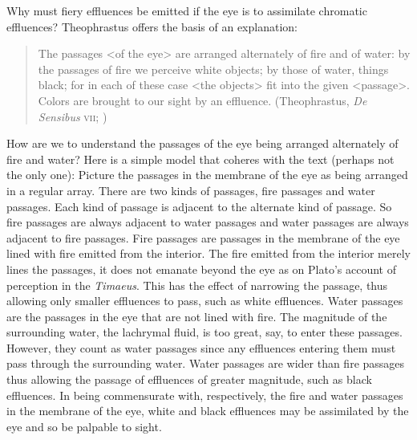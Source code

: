 Why must fiery effluences be emitted if the eye is to assimilate chromatic effluences? Theophrastus offers the basis of an explanation:
\begin{quote}
	The passages <of the eye> are arranged alternately of fire and of water: by the passages of fire we perceive white objects; by those of water, things black; for in each of these case <the objects> fit into the given <passage>. Colors are brought to our sight by an effluence. (Theophrastus, \emph{De Sensibus} \textsc{vii}; \citealt[71--73]{Stratton:1917vn})
\end{quote}
How are we to understand the passages of the eye being arranged alternately of fire and water? Here is a simple model that coheres with the text (perhaps not the only one): Picture the passages in the membrane of the eye as being arranged in a regular array. There are two kinds of passages, fire passages and water passages. Each kind of passage is adjacent to the alternate kind of passage. So fire passages are always adjacent to water passages and water passages are always adjacent to fire passages. Fire passages are passages in the membrane of the eye lined with fire emitted from the interior. The fire emitted from the interior merely lines the passages, it does not emanate beyond the eye as on Plato's account of perception in the \emph{Timaeus}. This has the effect of narrowing the passage, thus allowing only smaller effluences to pass, such as white effluences. Water passages are the passages in the eye that are not lined with fire. The magnitude of the surrounding water, the lachrymal fluid, is too great, say, to enter these passages. However, they count as water passages since any effluences entering them must pass through the surrounding water. Water passages are wider than fire passages thus allowing the passage of effluences of greater magnitude, such as black effluences. In being commensurate with, respectively, the fire and water passages in the membrane of the eye, white and black effluences may be assimilated by the eye and so be palpable to sight. 

